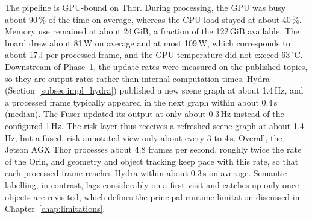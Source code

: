 {\small The pipeline is GPU-bound on Thor. During processing, the GPU was busy about 90\,\% of the time on average, whereas the CPU load stayed at about 40\,\%. Memory use remained at about 24\,GiB, a fraction of the 122\,GiB available. The board drew about 81\,W on average and at most 109\,W, which corresponds to about 17\,J per processed frame, and the GPU temperature did not exceed 63\,$^{\circ}$C. Downstream of Phase~1, the update rates were measured on the published topics, so they are output rates rather than internal computation times. Hydra~\cite{hughes2022hydra} (Section~\ref{subsec:impl_hydra}) published a new scene graph at about 1.4\,Hz, and a processed frame typically appeared in the next graph within about 0.4\,s (median). The Fuser updated its output at only about 0.3\,Hz instead of the configured 1\,Hz. The risk layer thus receives a refreshed scene graph at about 1.4\,Hz, but a fused, risk-annotated view only about every 3 to 4\,s. Overall, the Jetson AGX Thor processes about 4.8 frames per second, roughly twice the rate of the Orin, and geometry and object tracking keep pace with this rate, so that each processed frame reaches Hydra within about 0.3\,s on average. Semantic labelling, in contrast, lags considerably on a first visit and catches up only once objects are revisited, which defines the principal runtime limitation discussed in Chapter~\ref{chap:limitations}.\par}












